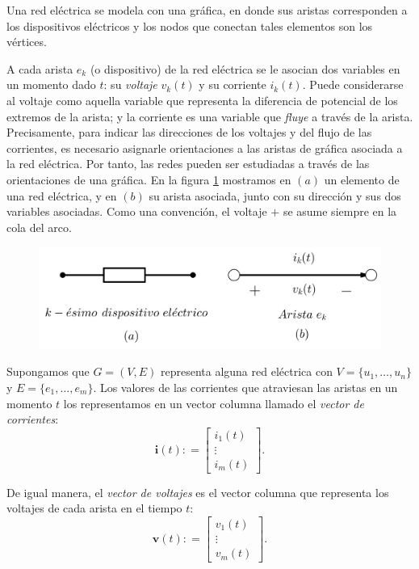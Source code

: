 Una red eléctrica se modela con una gráfica, en donde sus aristas corresponden a los dispositivos eléctricos y los nodos que conectan tales elementos son los vértices.

A cada arista $e_{k}$ (o dispositivo) de la red eléctrica se le asocian dos variables en un momento dado $t$: su \textit{voltaje} $v_{k}(t)$ y su corriente $i_{k}(t)$. Puede considerarse al voltaje como aquella variable que representa la  diferencia de potencial de los extremos de la arista; y la corriente es una variable que \textit{fluye} a través de la arista.  Precisamente, para indicar las direcciones de los voltajes y del flujo de las corrientes, es necesario asignarle orientaciones a las aristas de gráfica asociada a la red eléctrica. Por tanto, las redes pueden ser estudiadas a través de las orientaciones de una gráfica. En la figura \ref{fig:dispositivo electrico} mostramos en $(a)$ un elemento de una red eléctrica, y en $(b)$ su arista asociada, junto con su dirección y sus dos variables asociadas. Como una convención, el voltaje $+$ se asume siempre en la cola del arco.

\begin{figure}[H]
    \centering
    \includegraphics[scale=0.25]{img/imgchapter4/dispositivoelectrico.jpg}
    \caption{}
    \label{fig:dispositivo electrico}
\end{figure}

Supongamos que $G=(V,E)$ representa alguna red eléctrica con $V=\{u_{1}, \ldots, u_{n} \}$ y $E =\{e_{1}, \ldots, e_{m}\}$. Los valores de las corrientes que atraviesan las aristas en un momento $t$ los representamos en un vector columna llamado el \textit{vector de corrientes}:
$$
\mathbf{i}(t): = \begin{bmatrix} 
i_{1}(t) \\
\vdots \\
i_{m}(t)
\end{bmatrix}.
$$

De igual manera, el \textit{vector de voltajes} es el vector columna que representa los voltajes de cada arista en el tiempo $t$:
$$
\mathbf{v}(t): = \begin{bmatrix} 
v_{1}(t) \\
\vdots \\
v_{m}(t)
\end{bmatrix}.
$$

